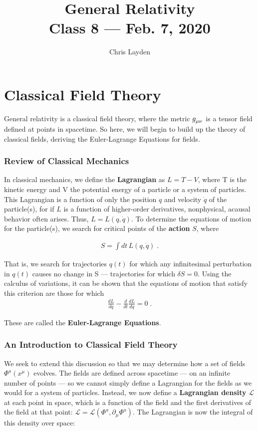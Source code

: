 \documentclass[10pt]{article}
\title{{\Huge General Relativity}\\{\Large{Class 8 --- Feb. 7, 2020}}} %
\author{Chris Layden}
\begin{document}
    \maketitle
    \flushbottom
    \newpage
    \pagestyle{fancynotes}
    \part{Classical Field Theory}
	General relativity is a classical field theory, where the metric $\tensor{g}{_\mu_\nu}$ is a tensor field defined at points in spacetime. So here, we will begin to build up the theory of classical fields, deriving the Euler-Lagrange Equations for fields.
	
              	\section{Review of Classical Mechanics}\label{sec:class_style}
              	In classical mechanics, we define the \textbf{Lagrangian} as $L=T-V$, where T is the kinetic energy and V the potential energy of a particle or a system of particles. This Lagrangian is a function of only the position $q$ and velocity $\dot{q}$ of the particle(s), for if $L$ is a function of higher-order derivatives, nonphysical, acausal behavior often arises. Thus, $L = L(q,\dot{q})$. To determine the equations of motion for the particle(s), we search for critical points of the \textbf{action} $S$, where 
              	
              	\begin{align}\label{eq:action}
              	S=\int dt\, L(q,\dot{q})\;.
              	\end{align}
              	
              	That is, we search for trajectories $q(t)$ for which any infinitesimal perturbation in $q(t)$ causes no change in S --- trajectories for which $\delta S=0$. Using the calculus of variations, it can be shown that the equations of motion that satisfy this criterion are those for which
              	\begin{align}\label{eq:ELE}
              	\frac{dL}{dq}-\frac{d}{dt}\frac{dL}{d\dot{q}}=0\;.
              	\end{align}
              	
              	These are called the \textbf{Euler-Lagrange Equations}.
    		 
               	\section{An Introduction to Classical Field Theory}\label{sec:useful_pkg}
               		We seek to extend this discussion so that we may  determine how a set of fields $\Phi^a(x^\mu)$ evolves. The fields are defined across spacetime --- on an infinite number of points --- so we cannot simply define a Lagrangian for the fields as we would for a system of particles. Instead, we now define a \textbf{Lagrangian density} $\mathcal{L}$ at each point in space, which is a function of the field and the first derivatives of the field at that point: $\mathcal{L} = \mathcal{L}(\Phi^a,\partial_\mu \Phi^a)$. The Lagrangian is now the integral of this density over space:
               		
\end{document}
